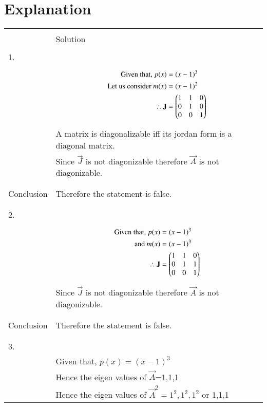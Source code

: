 \documentclass[journal,12pt]{IEEEtran}
\begin{document}
\section{\textbf{Explanation}}
\renewcommand{\thetable}{2}
\begin{longtable}{|l|l|}
\hline
\multirow{3}{*}{} & \\
Statement&Solution\\
\hline
&\\
1.&\\
&\parbox{6cm}{\begin{align*}
    \mbox{Given that, }p(x)&=(x-1)^3\\
    \mbox{Let us consider }m(x)&=(x-1)^2\\
    \therefore \mathbf{J}&=\begin{pmatrix}1&1&0\\0&1&0\\0&0&1\end{pmatrix}
\end{align*}}\\
&A matrix is diagonalizable iff its jordan form is a diagonal matrix.\\
&Since $\vec{J}$ is not diagonizable therefore $\vec{A}$ is not diagonizable.\\
&\\
\hline
&\\
Conclusion&Therefore the statement is false.\\
&\\
\hline
&\\
2.&\\
&\parbox{6cm}{\begin{align*}
    \mbox{Given that, }p(x)&=(x-1)^3\\
    \mbox{and }m(x)&=(x-1)^3\\
    \therefore \mathbf{J}&=\begin{pmatrix}1&1&0\\0&1&1\\0&0&1\end{pmatrix}
\end{align*}}\\
&Since $\vec{J}$ is not diagonizable therefore $\vec{A}$ is not diagonizable.\\
&\\
\hline
&\\
Conclusion&Therefore the statement is false.\\
&\\
\hline
&\\
3.&\\
&Given that, $p(x)=(x-1)^3$\\
&Hence the eigen values of $\vec{A}$=1,1,1\\
&Hence the eigen values of $\vec{A}^2=1^2,1^2,1^2$ or 1,1,1\\

\end{longtable}
\end{document}

